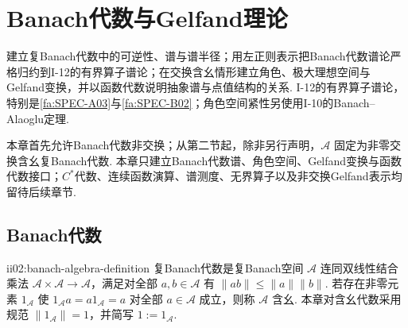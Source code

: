 \chapter{Banach代数与Gelfand理论}\label{chap:II-02}
\FAChapterOpening
{建立复Banach代数中的可逆性、谱与谱半径；用左正则表示把Banach代数谱论严格归约到I-12的有界算子谱论；在交换含幺情形建立角色、极大理想空间与Gelfand变换，并以函数代数说明抽象谱与点值结构的关系.}
{I-12的有界算子谱论，特别是\autoref{fa:SPEC-A03}与\autoref{fa:SPEC-B02}；角色空间紧性另使用I-10的Banach--Alaoglu定理.}
{\begin{center}
\end{center}}

本章首先允许Banach代数非交换；从第二节起，除非另行声明，\(\displaystyle \mathcal A\) 固定为非零交换含幺复Banach代数. 本章只建立Banach代数谱、角色空间、Gelfand变换与函数代数接口；\(\displaystyle C^*\)代数、连续函数演算、谱测度、无界算子以及非交换Gelfand表示均留待后续章节.

\section{Banach代数}\label{sec:ii02-banach-algebra}

\begin{FADefinition}[A][复Banach代数]{ii02:banach-algebra-definition}
复Banach代数是复Banach空间 \(\displaystyle \mathcal A\) 连同双线性结合乘法 \(\displaystyle \mathcal A\times\mathcal A\to\mathcal A\)，满足对全部 \(\displaystyle a,b\in\mathcal A\) 有
\(\displaystyle \|ab\|\leqslant\|a\|\|b\|.\)
若存在非零元素 \(\displaystyle 1_{\mathcal A}\) 使 \(\displaystyle 1_{\mathcal A}a=a1_{\mathcal A}=a\) 对全部 \(\displaystyle a\in\mathcal A\) 成立，则称 \(\displaystyle \mathcal A\) 含幺. 本章对含幺代数采用规范 \(\displaystyle \|1_{\mathcal A}\|=1\)，并简写 \(\displaystyle 1:=1_{\mathcal A}\).
\end{FADefinition}


